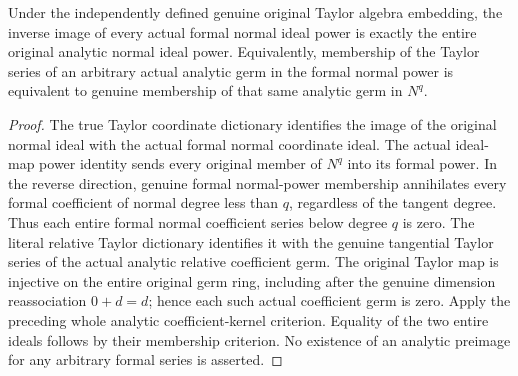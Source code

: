 \begin{theorem}
\label{hir:actual-formal-normal-power-contracts-exact-original-analytic-power}
\leanok
Under the independently defined genuine original Taylor algebra embedding,
the inverse image of every actual formal normal ideal power is exactly the
entire original analytic normal ideal power. Equivalently, membership of the
Taylor series of an arbitrary actual analytic germ in the formal normal power
is equivalent to genuine membership of that same analytic germ in $N^q$.
\end{theorem}
\begin{proof}
The true Taylor coordinate dictionary identifies the image of the original
normal ideal with the actual formal normal coordinate ideal. The actual
ideal-map power identity sends every original member of $N^q$ into its formal
power. In the reverse direction, genuine formal normal-power membership
annihilates every formal coefficient of normal degree less than $q$,
regardless of the tangent degree. Thus each entire formal normal coefficient
series below degree $q$ is zero. The literal relative Taylor dictionary
identifies it with the genuine tangential Taylor series of the actual analytic
relative coefficient germ. The original Taylor map is injective on the entire
original germ ring, including after the genuine dimension reassociation
$0+d=d$; hence each such actual coefficient germ is zero. Apply the preceding
whole analytic coefficient-kernel criterion. Equality of the two entire ideals
follows by their membership criterion. No existence of an analytic preimage
for any arbitrary formal series is asserted.
\end{proof}
